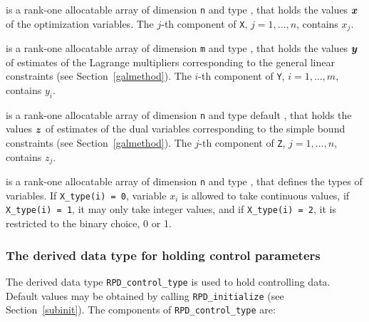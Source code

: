 \documentclass{galahad}
\newcommand{\packagename}{RPD}
\begin{document}
\begin{description}
 is a rank-one allocatable array of dimension {\tt n} and type
\realdp,
that holds the values ${\bm{x}}$ of the optimization variables.
The $j$-th component of {\tt X}, $j = 1,  \ldots , n$, contains $x_{j}$.

 is a rank-one allocatable array of dimension {\tt m} and type
\realdp, that holds
the values ${\bm{y}}$ of estimates  of the Lagrange multipliers
corresponding to the general linear constraints (see Section~\ref{galmethod}).
The $i$-th component of {\tt Y}, $i = 1,  \ldots ,  m$, contains $y_{i}$.

 is a rank-one allocatable array of dimension {\tt n} and type default
\realdp, that holds
the values ${\bm{z}}$ of estimates  of the dual variables
corresponding to the simple bound constraints (see Section~\ref{galmethod}).
The $j$-th component of {\tt Z}, $j = 1,  \ldots ,  n$, contains $z_{j}$.

 is a rank-one allocatable array of dimension {\tt n} and type
\integer, that defines the types of variables. If {\tt X\_type(i) = 0},
variable $x_i$ is allowed to take continuous values, if {\tt X\_type(i) = 1},
it may only take integer values, and if {\tt X\_type(i) = 2}, it is
restricted to the binary choice, 0 or 1.

\end{description}


\subsubsection{The derived data type for holding control
 parameters}\label{typecontrol}
The derived data type
{\tt \packagename\_control\_type}
is used to hold controlling data. Default values may be obtained by calling
{\tt \packagename\_initialize}
(see Section~\ref{subinit}). The components of
{\tt \packagename\_control\_type}
are:
\end{document}
